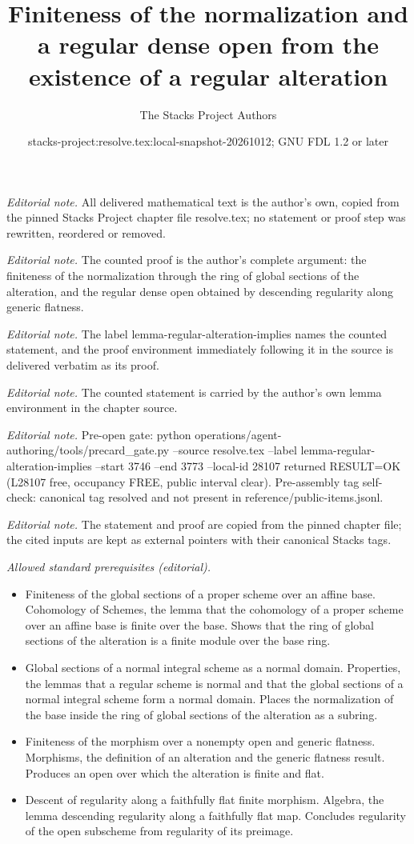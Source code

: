 \documentclass[10pt,a4paper]{amsart}
\title{Finiteness of the normalization and a regular dense open from the existence of a regular alteration}
\author{The Stacks Project Authors}
\date{stacks-project:resolve.tex:local-snapshot-20261012; GNU FDL 1.2 or later}
\theoremstyle{plain}
\theoremstyle{definition}
\theoremstyle{remark}
\numberwithin{equation}{subsection}
\begin{document}
\maketitle
\noindent\textit{Editorial note.} All delivered mathematical text is the author's own, copied from the pinned Stacks Project chapter file resolve.tex; no statement or proof step was rewritten, reordered or removed.\par\medskip
\noindent\textit{Editorial note.} The counted proof is the author's complete argument: the finiteness of the normalization through the ring of global sections of the alteration, and the regular dense open obtained by descending regularity along generic flatness.\par\medskip
\noindent\textit{Editorial note.} The label lemma-regular-alteration-implies names the counted statement, and the proof environment immediately following it in the source is delivered verbatim as its proof.\par\medskip
\noindent\textit{Editorial note.} The counted statement is carried by the author's own lemma environment in the chapter source.\par\medskip
\noindent\textit{Editorial note.} Pre-open gate: python operations/agent-authoring/tools/precard\_gate.py --source resolve.tex --label lemma-regular-alteration-implies --start 3746 --end 3773 --local-id 28107 returned RESULT=OK (L28107 free, occupancy FREE, public interval clear). Pre-assembly tag self-check: canonical tag resolved and not present in reference/public-items.jsonl.\par\medskip
\noindent\textit{Editorial note.} The statement and proof are copied from the pinned chapter file; the cited inputs are kept as external pointers with their canonical Stacks tags.\par\medskip
\noindent\textit{Allowed standard prerequisites (editorial).}\begin{itemize}
\item Finiteness of the global sections of a proper scheme over an affine base. Cohomology of Schemes, the lemma that the cohomology of a proper scheme over an affine base is finite over the base. Shows that the ring of global sections of the alteration is a finite module over the base ring.
\item Global sections of a normal integral scheme as a normal domain. Properties, the lemmas that a regular scheme is normal and that the global sections of a normal integral scheme form a normal domain. Places the normalization of the base inside the ring of global sections of the alteration as a subring.
\item Finiteness of the morphism over a nonempty open and generic flatness. Morphisms, the definition of an alteration and the generic flatness result. Produces an open over which the alteration is finite and flat.
\item Descent of regularity along a faithfully flat finite morphism. Algebra, the lemma descending regularity along a faithfully flat map. Concludes regularity of the open subscheme from regularity of its preimage.
\end{itemize}\medskip
\end{document}
